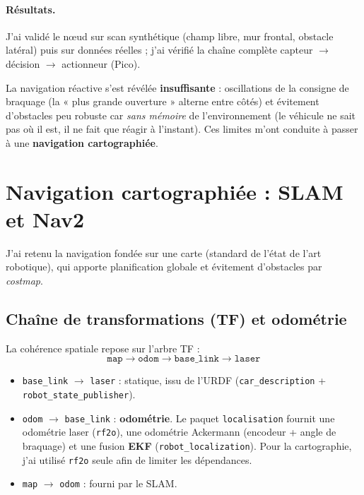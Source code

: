 \documentclass[a4paper,11pt]{article}
\begin{document}
\paragraph{Résultats.} J'ai validé le n{\oe}ud sur scan synthétique (champ libre,
mur frontal, obstacle latéral) puis sur données réelles ; j'ai vérifié la chaîne
complète capteur $\rightarrow$ décision $\rightarrow$ actionneur (Pico).

\begin{tcolorbox}[colback=lightorange, colframe=warning, title=\textbf{Limites de l'approche réactive}]
La navigation réactive s'est révélée \textbf{insuffisante} : oscillations de la
consigne de braquage (la « plus grande ouverture » alterne entre côtés) et
évitement d'obstacles peu robuste car \emph{sans mémoire} de l'environnement (le
véhicule ne sait pas où il est, il ne fait que réagir à l'instant). Ces limites
m'ont conduite à passer à une \textbf{navigation cartographiée}.
\end{tcolorbox}

\section{Navigation cartographiée : SLAM et Nav2}
J'ai retenu la navigation fondée sur une carte (standard de l'état de l'art
robotique), qui apporte planification globale et évitement d'obstacles par
\emph{costmap}.

\subsection{Chaîne de transformations (TF) et odométrie}
La cohérence spatiale repose sur l'arbre TF :
\[
\texttt{map} \rightarrow \texttt{odom} \rightarrow \texttt{base\_link}
\rightarrow \texttt{laser}
\]
\begin{itemize}[leftmargin=1.4em, nosep]
  \item \texttt{base\_link} $\rightarrow$ \texttt{laser} : statique, issu de l'URDF
        (\texttt{car\_description} + \texttt{robot\_state\_publisher}).
  \item \texttt{odom} $\rightarrow$ \texttt{base\_link} : \textbf{odométrie}. Le
        paquet \texttt{localisation} fournit une odométrie laser (\texttt{rf2o}),
        une odométrie Ackermann (encodeur + angle de braquage) et une fusion
        \textbf{EKF} (\texttt{robot\_localization}). Pour la cartographie, j'ai
        utilisé \texttt{rf2o} seule afin de limiter les dépendances.
  \item \texttt{map} $\rightarrow$ \texttt{odom} : fourni par le SLAM.
\end{itemize}
\end{document}
